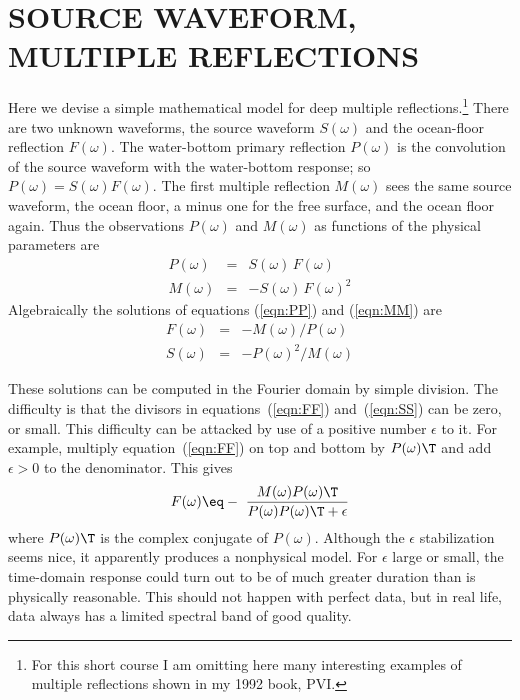 \section{SOURCE WAVEFORM, MULTIPLE REFLECTIONS}
Here we devise a simple mathematical model
for deep  multiple reflections.\footnote{
                For this short course I am omitting here many interesting
                examples of multiple reflections
                shown in my 1992 book, PVI.
                }
There are two unknown waveforms,
the source waveform $S(\omega )$
and the ocean-floor reflection $F(\omega )$.
The water-bottom primary reflection $P(\omega )$
is the convolution of the source waveform
with the water-bottom response; so $P(\omega )=S(\omega )F(\omega )$.
The first multiple reflection $M(\omega )$ sees the same source waveform,
the ocean floor, a minus one for the free surface, and the ocean floor again.
Thus the observations $P(\omega )$ and $M(\omega )$
as functions of the physical parameters are
\begin{eqnarray}
P(\omega )&=&S(\omega )\,F(\omega )      \label{eqn:PP} \\
M(\omega )&=&-S(\omega )\,F(\omega )^2   \label{eqn:MM}
\end{eqnarray}
Algebraically the solutions of equations
(\ref{eqn:PP}) and
(\ref{eqn:MM}) are
\begin{eqnarray}
F(\omega )&=& - M(\omega )/P(\omega )   \label{eqn:FF} \\
S(\omega )&=& - P(\omega )^2/M(\omega ) \label{eqn:SS}
\end{eqnarray}

\par
These solutions can be computed in the Fourier domain
by simple division.
The difficulty is that the divisors in
equations~(\ref{eqn:FF}) and~(\ref{eqn:SS})
can be zero, or small.
This difficulty can be attacked by use of a positive number $\epsilon$
to  it.
For example, multiply equation~(\ref{eqn:FF}) on top and bottom
by $P(\omega )\T$ and add $\epsilon >0$ to the denominator.
This gives
\begin{equation}
F(\omega )\eq
- \ \frac{M(\omega ) P(\omega )\T}{P(\omega )P(\omega )\T + \epsilon}
\label{eqn:epsilon}
\end{equation}
where $ P(\omega )\T$ is the complex conjugate of $P(\omega )$.
Although the $\epsilon$ stabilization seems nice,
it apparently produces a nonphysical model.
For $\epsilon$ large or small, the time-domain response
could turn out to be of much greater duration than is physically reasonable. 
This should not happen with perfect data, but in real life,
data always has a limited spectral band of good quality.

